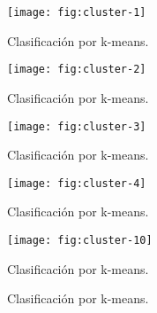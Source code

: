 \begin{frame}{}
  \begin{figure}
    \centering
    \texttt{[image: fig:cluster-1]}
    \caption{Clasificación por k-means.}
    \label{}
  \end{figure}
\end{frame}

\begin{frame}{}
  \begin{figure}
    \centering
    \texttt{[image: fig:cluster-2]}
    \caption{Clasificación por k-means.}
    \label{}
  \end{figure}
\end{frame}

\begin{frame}{}
  \begin{figure}
    \centering
    \texttt{[image: fig:cluster-3]}
    \caption{Clasificación por k-means.}
    \label{}
  \end{figure}
\end{frame}

\begin{frame}{}
  \begin{figure}
    \centering
    \texttt{[image: fig:cluster-4]}
    \caption{Clasificación por k-means.}
    \label{}
  \end{figure}
\end{frame}

\begin{frame}{}
  \begin{figure}
    \centering
    \texttt{[image: fig:cluster-10]}
    \caption{Clasificación por k-means.}
    \label{}
  \end{figure}
\end{frame}

\begin{frame}{}
  \begin{figure}
    \centering
    \hspace{1cm}
    \caption{Clasificación por k-means.}
    \label{}
  \end{figure}
\end{frame}

